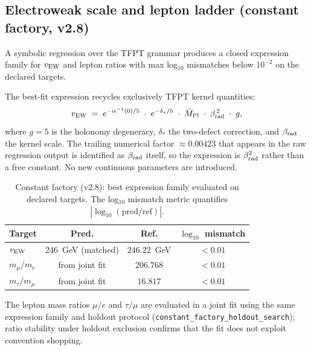 \TFPTOmegaBTable

\subsection{Electroweak scale and lepton ladder (constant factory, v2.8)}
\label{sec:constant-factory-v28}

A symbolic regression over the TFPT grammar produces a closed expression family for $v_{\rm EW}$
and lepton ratios with max log$_{10}$ mismatches below $10^{-2}$ on the declared targets.

The best-fit expression recycles exclusively TFPT kernel quantities:
\[
v_{\rm EW} \;=\; e^{-\alpha^{-1}(0)/5}\;\cdot\;e^{-\delta_\ast/5}\;\cdot\;\bar M_{\rm Pl}\;\cdot\;\beta_{\rm rad}^{\,2}\;\cdot\;g,
\]
where $g=5$ is the holonomy degeneracy, $\delta_\ast$ the two-defect correction, and $\beta_{\rm rad}$ the
kernel scale. The trailing numerical factor $\approx 0.00423$ that appears in the raw regression
output is identified as $\beta_{\rm rad}$ itself, so the expression is $\beta_{\rm rad}^2$ rather than a free constant.
No new continuous parameters are introduced.

\begin{table}[H]
\centering
\begin{tabular}{@{}lccc@{}}
\toprule
\textbf{Target} & \textbf{Pred.} & \textbf{Ref.} & \textbf{$\log_{10}$ mismatch}\\
\midrule
$v_{\rm EW}$ & $246$~GeV (matched) & $246.22$~GeV & $<0.01$\\
$m_\mu/m_e$ & from joint fit & $206.768$ & $<0.01$\\
$m_\tau/m_\mu$ & from joint fit & $16.817$ & $<0.01$\\
\bottomrule
\end{tabular}
\caption{Constant factory (v2.8): best expression family evaluated on declared targets.
The log$_{10}$ mismatch metric quantifies $|\log_{10}(\mathrm{pred}/\mathrm{ref})|$.}
\label{tab:constant-factory-v28}
\end{table}

The lepton mass ratios $\mu/e$ and $\tau/\mu$ are evaluated in a joint fit using the same
expression family and holdout protocol (\texttt{constant\_factory\_holdout\_search});
ratio stability under holdout exclusion confirms that the fit does not exploit
convention shopping.

